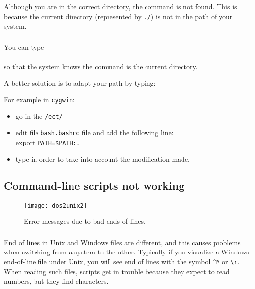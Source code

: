 Although you are in the correct directory, the command is not found. This is because the current directory (represented by \texttt{./}) is not in the path of your system. 

\subsubsection{\answer}

You can type \\
\\
so that the system knows the command is the current directory.

A better solution is to adapt your path by typing:\\

For example in \texttt{cygwin}:\\
\begin{itemize}
\item go in the \texttt{/ect/}
\item edit file \texttt{bash.bashrc} file
and add the following line:\\
export \texttt{PATH=\$PATH:.}
\item type  in order to take into account the modification made.
\end{itemize}




\subsection{Command-line scripts not working}


\begin{figure}[htpb]
\centering
\texttt{[image: dos2unix2]}
\caption{Error messages due to bad ends of lines. \label{fig:error_dos2unix}}
\end{figure}

\subsubsection{\question}

End of lines in Unix and Windows files are different, and this causes problems when switching from a system to the other. Typically if you visualize a Windows-end-of-line file under Unix, you will see end of lines with the symbol \verb|^M| or \verb|\r|. When reading such files, scripts get in trouble because they expect to read numbers, but they find characters.


